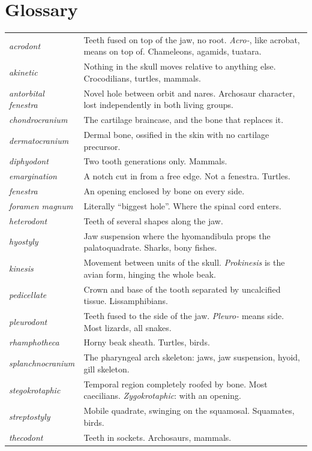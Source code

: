 \documentclass[11pt]{article}
\newcommand{\term}[1]{\textsl{#1}}
\begin{document}

\section{Glossary}

\begingroup\footnotesize
\begin{xltabular}{\linewidth}{L{3.3cm} X}
\toprule
\endhead
\term{acrodont} & Teeth fused on top of the jaw, no root. \emph{Acro-}, like
  acrobat, means on top of. Chameleons, agamids, tuatara. \\
\term{akinetic} & Nothing in the skull moves relative to anything else.
  Crocodilians, turtles, mammals. \\
\term{antorbital fenestra} & Novel hole between orbit and nares. Archosaur
  character, lost independently in both living groups. \\
\term{chondrocranium} & The cartilage braincase, and the bone that replaces it. \\
\term{dermatocranium} & Dermal bone, ossified in the skin with no cartilage
  precursor. \\
\term{diphyodont} & Two tooth generations only. Mammals. \\
\term{emargination} & A notch cut in from a free edge. Not a fenestra.
  Turtles. \\
\term{fenestra} & An opening enclosed by bone on every side. \\
\term{foramen magnum} & Literally ``biggest hole''. Where the spinal cord
  enters. \\
\term{heterodont} & Teeth of several shapes along the jaw. \\
\term{hyostyly} & Jaw suspension where the hyomandibula props the
  palatoquadrate. Sharks, bony fishes. \\
\term{kinesis} & Movement between units of the skull. \term{Prokinesis} is the
  avian form, hinging the whole beak. \\
\term{pedicellate} & Crown and base of the tooth separated by uncalcified
  tissue. Lissamphibians. \\
\term{pleurodont} & Teeth fused to the side of the jaw. \emph{Pleuro-} means
  side. Most lizards, all snakes. \\
\term{rhamphotheca} & Horny beak sheath. Turtles, birds. \\
\term{splanchnocranium} & The pharyngeal arch skeleton: jaws, jaw suspension,
  hyoid, gill skeleton. \\
\term{stegokrotaphic} & Temporal region completely roofed by bone. Most
  caecilians. \term{Zygokrotaphic}: with an opening. \\
\term{streptostyly} & Mobile quadrate, swinging on the squamosal. Squamates,
  birds. \\
\term{thecodont} & Teeth in sockets. Archosaurs, mammals. \\
\bottomrule
\end{xltabular}\endgroup
\end{document}
